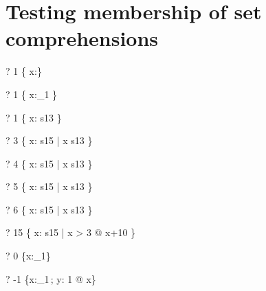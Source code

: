 \documentclass{article}
\newcommand{\negate}{-}
\begin{document}
\section{Testing membership of set comprehensions}
\begin{zed} \vdash?  1 \in    \{ x:\nat \} \end{zed}
\begin{zed} \vdash?  1 \in    \{ x:\nat_1 \} \end{zed}
\begin{zed} \vdash?  1 \in    \{ x: s13 \} \end{zed}
\begin{zed} \vdash?  3 \notin \{ x: s15 | x \notin s13 \} \end{zed}
\begin{zed} \vdash?  4 \in    \{ x: s15 | x \notin s13 \} \end{zed}
\begin{zed} \vdash?  5 \in    \{ x: s15 | x \notin s13 \} \end{zed}
\begin{zed} \vdash?  6 \notin \{ x: s15 | x \notin s13 \} \end{zed}
\begin{zed} \vdash?  15 \in   \{ x: s15 | x > 3 @ x+10 \} \end{zed}
\begin{zed} \vdash?  0 \notin \{x:\nat_1\} \end{zed}
\begin{zed} \vdash?  \negate 1 \notin \{x:\nat_1\,; y: 1  @ x\} \end{zed}
\end{document}
